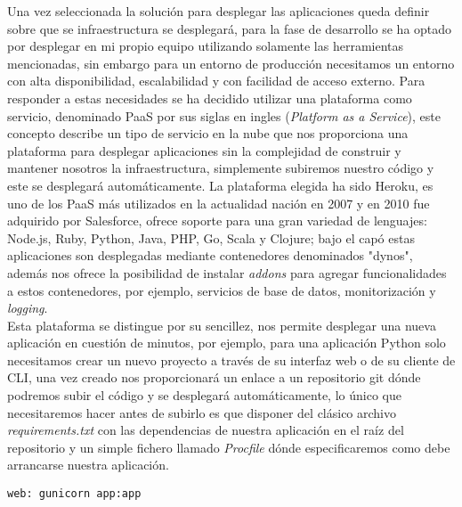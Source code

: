 \documentclass[../proyecto.tex]{subfiles}
\begin{document}
Una vez seleccionada la solución para desplegar las aplicaciones queda definir sobre que se infraestructura se desplegará, para la fase de desarrollo se ha optado por desplegar en mi propio equipo utilizando solamente las herramientas mencionadas, sin embargo para un entorno de producción necesitamos un entorno con alta disponibilidad, escalabilidad y con facilidad de acceso externo. Para responder a estas necesidades se ha decidido utilizar una plataforma como servicio, denominado PaaS por sus siglas en ingles (\textit{Platform as a Service}), este concepto describe un tipo de servicio en la nube que nos proporciona una plataforma para desplegar aplicaciones sin la complejidad de construir y mantener nosotros la infraestructura, simplemente subiremos nuestro código y este se desplegará automáticamente. La plataforma elegida ha sido Heroku, es uno de los PaaS más utilizados en la actualidad nación en 2007 y en 2010 fue adquirido por Salesforce, ofrece soporte para una gran variedad de lenguajes: Node.js, Ruby, Python, Java, PHP, Go, Scala y Clojure; bajo el capó estas aplicaciones son desplegadas mediante contenedores denominados "dynos", además nos ofrece la posibilidad de instalar \textit{addons} para agregar funcionalidades a estos contenedores, por ejemplo, servicios de base de datos, monitorización y \textit{logging}.\\

 Esta plataforma se distingue por su sencillez, nos permite desplegar una nueva aplicación en cuestión de minutos, por ejemplo, para una aplicación Python solo necesitamos crear un nuevo proyecto a través de su interfaz web o de su cliente de CLI, una vez creado nos proporcionará un enlace a un repositorio git dónde podremos subir el código y se desplegará automáticamente, lo único que necesitaremos hacer antes de subirlo es que disponer del clásico archivo \textit{requirements.txt} con las dependencias de nuestra aplicación en el raíz del repositorio y un simple fichero llamado \textit{Procfile} dónde especificaremos como debe arrancarse nuestra aplicación.\\

 \begin{minipage}{\linewidth}
 \begin{lstlisting}[caption=Ejemplo de fichero Procfile para desplegar una apliación Flask en Heroku , captionpos=b, frame=single]
 web: gunicorn app:app
 \end{lstlisting}
 \end{minipage}
\end{document}
